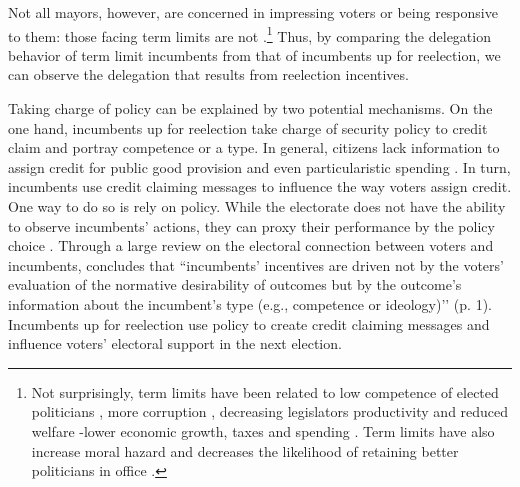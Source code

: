 \documentclass[12pt]{amsart}
\numberwithin{equation}{section}
\theoremstyle{definition}
\theoremstyle{definition}
\theoremstyle{definition}
\begin{document}
Not all mayors, however, are concerned in impressing voters or being responsive to them: those facing term limits are not \citep{ashworth_2012, mayhew_1974, manin_etal_1999}.\footnote{Not surprisingly, term limits have been related to low competence of elected politicians \citep{dalbo_etal_2017}, more corruption \citep{ferraz_finan_2011}, decreasing legislators productivity \citep{hall_etal_2018} and reduced welfare -lower economic growth, taxes and spending \citep{alt_etal_2011}. Term limits have also increase moral hazard and decreases the likelihood of retaining better politicians in office \citep{smart_sturm_2013}.} Thus, by comparing the delegation behavior of term limit incumbents from that of incumbents up for reelection, we can observe the delegation that results from reelection incentives. 

Taking charge of policy can be explained by two potential mechanisms. On the one hand, incumbents up for reelection take charge of security policy to credit claim and portray competence or a type. In general, citizens lack information to assign credit for public good provision and even particularistic spending \citep{grimmer_etal_2012}. In turn, incumbents use credit claiming messages to influence the way voters assign credit. One way to do so is rely on policy. While the electorate does not have the ability to observe incumbents’ actions, they can proxy their performance by the policy choice \citep{ferejohn_1986}. Through a large review on the electoral connection between voters and incumbents, \citet{ashworth_2012} concludes that ``incumbents’ incentives are driven not by the voters’ evaluation of the normative desirability of outcomes but by the outcome’s information about the incumbent’s type (e.g., competence or ideology)’’ (p. 1). Incumbents up for reelection use policy to create credit claiming messages and influence voters’ electoral support in the next election. 
\end{document}
